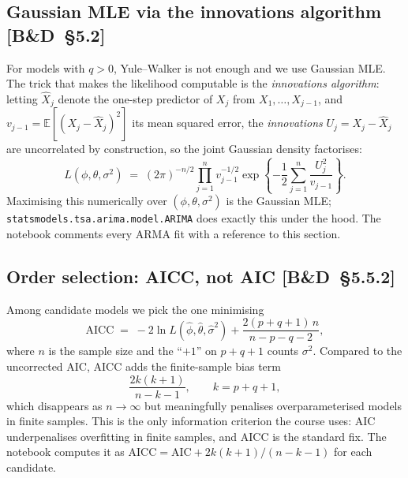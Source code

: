 \documentclass[11pt,a4paper]{article}
\newcommand{\E}{\mathbb{E}}
\newcommand{\BD}[1]{\textsc{[B\&D~§#1]}}
\begin{document}
\subsection*{Gaussian MLE via the innovations algorithm \BD{5.2}}
For models with $q > 0$, Yule--Walker is not enough and we use Gaussian MLE.
The trick that makes the likelihood computable is the \emph{innovations
algorithm}: letting $\hat X_j$ denote the one-step predictor of $X_j$ from
$X_1, \ldots, X_{j-1}$, and $v_{j-1} = \E[(X_j - \hat X_j)^2]$ its mean squared
error, the \emph{innovations} $U_j = X_j - \hat X_j$ are uncorrelated by
construction, so the joint Gaussian density factorises:
\begin{equation}
L(\phi, \theta, \sigma^2)
\;=\;
(2\pi)^{-n/2} \prod_{j=1}^{n} v_{j-1}^{-1/2}
\exp\!\left\{ -\frac{1}{2} \sum_{j=1}^{n} \frac{U_j^2}{v_{j-1}} \right\}.
\end{equation}
Maximising this numerically over $(\phi, \theta, \sigma^2)$ is the Gaussian
MLE; \texttt{statsmodels.tsa.arima.model.ARIMA} does exactly this under the
hood. The notebook comments every ARMA fit with a reference to this section.

\subsection*{Order selection: AICC, not AIC \BD{5.5.2}}
Among candidate models we pick the one minimising
\begin{equation}
\mathrm{AICC}
\;=\;
-2 \ln L(\hat\phi, \hat\theta, \hat\sigma^2)
+ \frac{2(p + q + 1)\,n}{n - p - q - 2},
\label{eq:aicc}
\end{equation}
where $n$ is the sample size and the ``$+1$'' on $p+q+1$ counts $\sigma^2$.
Compared to the uncorrected AIC, AICC adds the finite-sample bias term
\begin{equation}
\frac{2k(k+1)}{n - k - 1}, \qquad k = p + q + 1,
\end{equation}
which disappears as $n \to \infty$ but meaningfully penalises overparameterised
models in finite samples. This is the only information criterion the course
uses: AIC underpenalises overfitting in finite samples, and AICC is the
standard fix. The notebook computes it as
$\mathrm{AICC} = \mathrm{AIC} + 2k(k+1)/(n-k-1)$ for each candidate.
\end{document}
